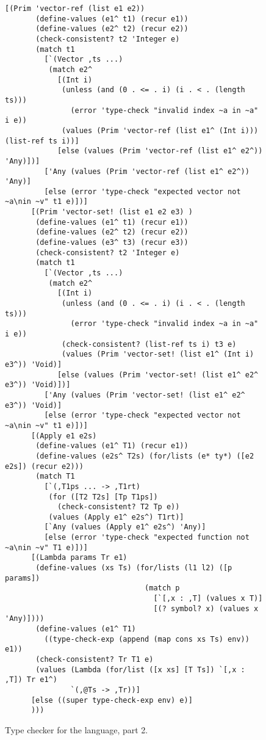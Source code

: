 \documentclass[7x10]{TimesAPriori_MIT}%
\numberwithin{theorem}{chapter}
\numberwithin{definition}{chapter}
\numberwithin{equation}{chapter}
\begin{document}
{\begin{figure}[tbp]
\begin{tcolorbox}[colback=white]  
\begin{lstlisting}[basicstyle=\ttfamily\footnotesize]
      [(Prim 'vector-ref (list e1 e2))
       (define-values (e1^ t1) (recur e1))
       (define-values (e2^ t2) (recur e2))
       (check-consistent? t2 'Integer e)
       (match t1
         [`(Vector ,ts ...)
          (match e2^
            [(Int i)
             (unless (and (0 . <= . i) (i . < . (length ts)))
               (error 'type-check "invalid index ~a in ~a" i e))
             (values (Prim 'vector-ref (list e1^ (Int i))) (list-ref ts i))]
            [else (values (Prim 'vector-ref (list e1^ e2^)) 'Any)])]
         ['Any (values (Prim 'vector-ref (list e1^ e2^)) 'Any)]
         [else (error 'type-check "expected vector not ~a\nin ~v" t1 e)])]
      [(Prim 'vector-set! (list e1 e2 e3) )
       (define-values (e1^ t1) (recur e1))
       (define-values (e2^ t2) (recur e2))
       (define-values (e3^ t3) (recur e3))
       (check-consistent? t2 'Integer e)
       (match t1
         [`(Vector ,ts ...)
          (match e2^
            [(Int i)
             (unless (and (0 . <= . i) (i . < . (length ts)))
               (error 'type-check "invalid index ~a in ~a" i e))
             (check-consistent? (list-ref ts i) t3 e)
             (values (Prim 'vector-set! (list e1^ (Int i) e3^)) 'Void)]
            [else (values (Prim 'vector-set! (list e1^ e2^ e3^)) 'Void)])]
         ['Any (values (Prim 'vector-set! (list e1^ e2^ e3^)) 'Void)]
         [else (error 'type-check "expected vector not ~a\nin ~v" t1 e)])]
      [(Apply e1 e2s)
       (define-values (e1^ T1) (recur e1))
       (define-values (e2s^ T2s) (for/lists (e* ty*) ([e2 e2s]) (recur e2)))
       (match T1
         [`(,T1ps ... -> ,T1rt)
          (for ([T2 T2s] [Tp T1ps])
            (check-consistent? T2 Tp e))
          (values (Apply e1^ e2s^) T1rt)]
         [`Any (values (Apply e1^ e2s^) 'Any)]
         [else (error 'type-check "expected function not ~a\nin ~v" T1 e)])]
      [(Lambda params Tr e1)
       (define-values (xs Ts) (for/lists (l1 l2) ([p params])
                                (match p
                                  [`[,x : ,T] (values x T)]
                                  [(? symbol? x) (values x 'Any)])))
       (define-values (e1^ T1) 
         ((type-check-exp (append (map cons xs Ts) env)) e1))
       (check-consistent? Tr T1 e)
       (values (Lambda (for/list ([x xs] [T Ts]) `[,x : ,T]) Tr e1^)
               `(,@Ts -> ,Tr))]
      [else ((super type-check-exp env) e)]
      )))
\end{lstlisting}
\end{tcolorbox}
\caption{Type checker for the \LangGrad{} language, part 2.}
\label{fig:type-check-Lgradual-2}
\end{figure}

}
\end{document}

